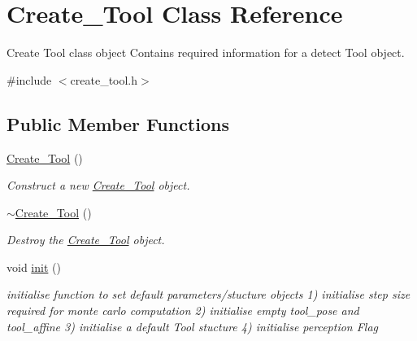 \hypertarget{classCreate__Tool}{}\section{Create\+\_\+\+Tool Class Reference}
\label{classCreate__Tool}


Create Tool class object Contains required information for a detect Tool object.  




{\ttfamily \#include $<$create\+\_\+tool.\+h$>$}

\subsection*{Public Member Functions}
\begin{DoxyCompactItemize}
\item 
\mbox{\label{classCreate__Tool_a8b1dfbba2c00f29ba9923a68d55bd508}} 
\hyperlink{classCreate__Tool_a8b1dfbba2c00f29ba9923a68d55bd508}{Create\+\_\+\+Tool} ()
\begin{DoxyCompactList}\small\item\em Construct a new \hyperlink{classCreate__Tool}{Create\+\_\+\+Tool} object. \end{DoxyCompactList}\item 
\mbox{\label{classCreate__Tool_af61d80c8faa7752af37806921ddc35e1}} 
\hyperlink{classCreate__Tool_af61d80c8faa7752af37806921ddc35e1}{$\sim$\+Create\+\_\+\+Tool} ()
\begin{DoxyCompactList}\small\item\em Destroy the \hyperlink{classCreate__Tool}{Create\+\_\+\+Tool} object. \end{DoxyCompactList}\item 
\mbox{\label{classCreate__Tool_a55627b189b24891751d7101598c6aa0d}} 
void \hyperlink{classCreate__Tool_a55627b189b24891751d7101598c6aa0d}{init} ()
\begin{DoxyCompactList}\small\item\em initialise function to set default parameters/stucture objects 1) initialise step size required for monte carlo computation 2) initialise empty tool\+\_\+pose and tool\+\_\+affine 3) initialise a default \textquotesingle{}Tool\textquotesingle{} stucture 4) initialise perception Flag \end{DoxyCompactList}\item 

\end{DoxyCompactItemize}
